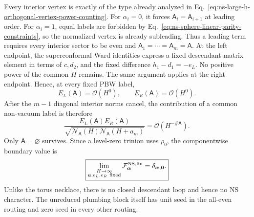 \documentclass[11pt]{article}
\newcommand{\NS}{\mathrm{NS}}
\newcommand{\F}{\mathcal F}
\newcommand{\order}{\mathcal O}
\begin{document}
Every interior vertex is exactly of the type already analyzed in
Eq.~\eqref{eq:ns-large-h-orthogonal-vertex-power-counting}.  For
\(\alpha_i=0\), it forces
\(\mathsf A_i=\mathsf A_{i+1}\) at leading order.  For \(\alpha_i=1\),
equal labels are forbidden by
Eq.~\eqref{eq:ns-sphere-linear-parity-constraints}, so the normalized
vertex is already subleading.  Thus a leading term requires every interior
sector to be even and
\(\mathsf A_1=\cdots=\mathsf A_m=\mathsf A\).  At the left endpoint, the
superconformal Ward identities express a fixed descendant
matrix element in terms of \(c,d_2\), and the fixed difference
\(h_1-d_1=-e_L\).  No positive power of the common \(H\) remains.  The same
argument applies at the right endpoint.  Hence, at every fixed PBW label,
\begin{equation}
 E_L(\mathsf A)=\order(H^0),
 \qquad
 E_R(\mathsf A)=\order(H^0).
 \label{eq:ns-sphere-linear-endpoint-power-counting}
\end{equation}
After the \(m-1\) diagonal interior norms cancel, the contribution of a
common non-vacuum label is therefore
\begin{equation}
 \frac{E_L(\mathsf A)E_R(\mathsf A)}
 {\sqrt{\mathcal N_{\mathsf A}(H)
 \mathcal N_{\mathsf A}(H+a_m)}}
 =
 \order\!\left(H^{-\#\mathsf A}\right).
 \label{eq:ns-sphere-linear-final-norm-suppression}
\end{equation}
Only \(\mathsf A=\varnothing\) survives.  Since a level-zero trinion uses
\(\rho_0\), the componentwise boundary value is
\begin{equation}
 \boxed{
 \lim_{\substack{H\to\infty\\
 \boldsymbol a,e_L,e_R\ {\rm fixed}}}
 \F^{\NS,\mathrm{lin}}_{\boldsymbol\alpha}
 =
 \delta_{\boldsymbol\alpha,\boldsymbol0}.}
 \label{eq:ns-sphere-linear-large-h-seed}
\end{equation}
Unlike the torus necklace, there is no closed descendant loop and hence no
NS character.  The unreduced plumbing block itself has unit seed in the
all-even routing and zero seed in every other routing.
\end{document}
